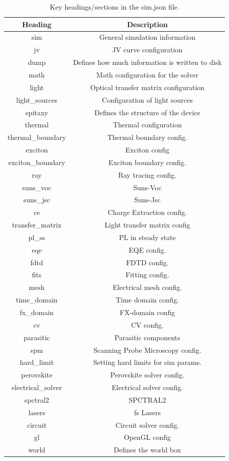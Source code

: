 \begin{table}
\begin{center}
\begin{tabular}{ |c|c| } 
 \hline
	Heading 			& 	Description  \\ 
 \hline
	sim					&	General simulation information \\
	jv					&	JV curve configuration \\
	dump				&	Defines how much information is written to disk \\
	math				&	Math configuration for the solver \\
	light				&	Optical transfer matrix configuration \\
	light\_sources		&	Configuration of light sources\\
	epitaxy				&	Defines the structure of the device\\
	thermal				&	Thermal configuration\\
	thermal\_boundary	&	Thermal boundary config.\\
	exciton				&	Exciton config\\
	exciton\_boundary	&	Exciton boundary config. \\
	ray					&	Ray tracing config.\\
	suns\_voc			&	Suns-Voc\\
	suns\_jsc			&	Suns-Jsc\\
	ce					&	Charge Extraction config.\\
	transfer\_matrix	&	Light transfer matrix config\\
	pl\_ss				&	PL in steady state\\
	eqe					&	EQE config.\\
	fdtd				&	FDTD config.\\
	fits				&	Fitting config.\\
	mesh				&	Electrical mesh config.\\
	time\_domain		&	Time domain config.\\
	fx\_domain			&	FX-domain config\\
	cv					&	CV config.\\
	parasitic			&	Parasitic components\\
	spm					&	Scanning Probe Microscopy config.\\
	hard\_limit			&	Setting hard limits for sim params.\\
	perovskite			&	Perovskite solver config.\\
	electrical\_solver	&	Electrical solver config.\\
	spctral2			&	SPCTRAL2\\
	lasers				&	fs Lasers \\
	circuit				&	Circuit solver config.\\
	gl					&	OpenGL config\\
	world				&	Defines the world box\\
 \hline
\end{tabular}
\caption{Key headings/sections in the sim.json file.}
\label{fig:jsontab}
\end{center}
\end{table}


